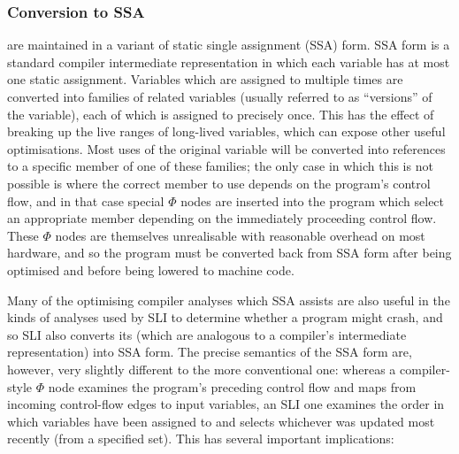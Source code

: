 \subsubsection{Conversion to SSA}
\label{sect:ssa}

\STateMachines are maintained in a variant of static single assignment
(SSA) form.  SSA form is a standard compiler intermediate
representation in which each variable has at most one static
assignment\needCite{}.  Variables which are assigned to multiple times
are converted into families of related variables (usually referred to
as ``versions'' of the variable), each of which is assigned to
precisely once.  This has the effect of breaking up the live ranges of
long-lived variables, which can expose other useful optimisations.
Most uses of the original variable will be converted into references
to a specific member of one of these families; the only case in which
this is not possible is where the correct member to use depends on the
program's control flow, and in that case special $\Phi$ nodes are
inserted into the program which select an appropriate member depending
on the immediately proceeding control flow.  These $\Phi$ nodes are
themselves unrealisable with reasonable overhead on most hardware, and
so the program must be converted back from SSA form after being
optimised and before being lowered to machine code.

Many of the optimising compiler analyses which SSA assists are also
useful in the kinds of analyses used by SLI to determine whether a
program might crash, and so SLI also converts its \StateMachines
(which are analogous to a compiler's intermediate representation) into
SSA form.  The precise semantics of the SSA form are, however, very
slightly different to the more conventional one: whereas a
compiler-style $\Phi$ node examines the program's preceding control
flow and maps from incoming control-flow edges to input variables, an
SLI one examines the order in which variables have been assigned to
and selects whichever was updated most recently (from a specified
set).  This has several important implications:

